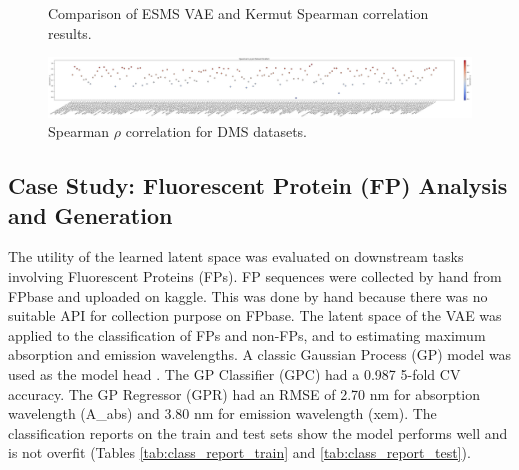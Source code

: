 \documentclass[unnumsec,webpdf,contemporary,medium]{oup-authoring-template}
\begin{document}
\begin{figure}[!ht]
    \centering
    \hfill
    \caption{Comparison of ESMS VAE and Kermut Spearman correlation results.}
    \label{fig:spearman_distribution}
\end{figure}
\begin{figure}[!ht]
    \centering
    \includegraphics[width=1\linewidth]{DMS.png}
    \caption{Spearman $\rho$ correlation for DMS datasets.}
    \label{fig:dms_result}
\end{figure}
\subsection{Case Study: Fluorescent Protein (FP) Analysis and Generation}\label{sec:fp_application}
The utility of the learned latent space was evaluated on downstream tasks involving Fluorescent Proteins (FPs). FP sequences were collected by hand from FPbase \cite{lambert2022fpbase} and uploaded on kaggle. This was done by hand because there was no suitable API for collection purpose on FPbase. The latent space of the VAE was applied to the classification of FPs and non-FPs, and to estimating maximum absorption and emission wavelengths. A classic Gaussian Process (GP) model was used as the model head \cite{rasmussen2006gaussian}. The GP Classifier (GPC) had a 0.987 5-fold CV accuracy. The GP Regressor (GPR) had an RMSE of 2.70 nm for absorption wavelength (A\_abs) and 3.80 nm for emission wavelength (xem). The classification reports on the train and test sets show the model performs well and is not overfit (Tables \ref{tab:class_report_train} and \ref{tab:class_report_test}).
\end{document}

